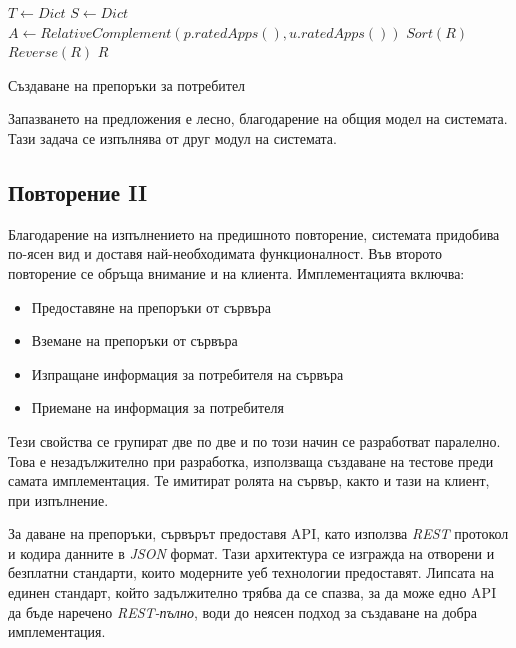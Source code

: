 		\begin{algorithm}[h]
			\label{algorithm:get-recommendations}
			$T \longleftarrow Dict $\;
			$S \longleftarrow Dict $\;
			$A \longleftarrow RelativeComplement(p.ratedApps(), u.ratedApps())$\;
			$Sort(R)$\;
			$Reverse(R)$\;
			\Return $R$\;
			\caption{Създаване на препоръки за потребител}
		\end{algorithm}
		
		Запазването на предложения е лесно, благодарение на общия модел на системата. Тази задача се изпълнява от друг модул на системата.
		
		\subsection{Повторение II}
		
		Благодарение на изпълнението на предишното повторение, системата придобива по-ясен вид и доставя най-необходимата функционалност. Във второто повторение се обръща внимание и на клиента. Имплементацията включва:
		
		\begin{itemize}
			\item Предоставяне на препоръки от сървъра
			\item Вземане на препоръки от сървъра
			\item Изпращане информация за потребителя на сървъра
			\item Приемане на информация за потребителя
		\end{itemize}
		
		Тези свойства се групират две по две и по този начин се разработват паралелно. Това е незадължително при разработка, използваща създаване на тестове преди самата имплементация. Те имитират ролята на сървър, както и тази на клиент, при изпълнение.
		
		За даване на препоръки, сървърът предоставя \ac{API}, като използва \emph{REST} протокол и кодира данните в \emph{JSON} формат. Тази архитектура се изгражда на отворени и безплатни стандарти, които модерните уеб технологии предоставят. Липсата на единен стандарт, който задължително трябва да се спазва, за да може едно \ac{API} да бъде наречено \emph{REST-пълно}, води до неясен подход за създаване на добра имплементация.
		
